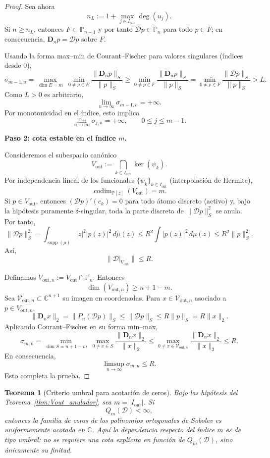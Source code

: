 \documentclass[12pt,a4paper]{article}
\newtheorem{theorem}{Teorema}
\theoremstyle{definition}
\theoremstyle{remark}
\newcommand{\Poly}{\mathbb{P}[z]}
\newcommand{\D}{\mathcal{D}}
\begin{document}
\begin{proof}
  Sea ahora
  \[
    n_L:=1+\max_{j\in I_{\mathrm{out}}}\deg(u_j).
  \]
  Si $n\ge n_L$, entonces $F\subset\mathbb P_{n-1}$ y por tanto
  $\D p\in\mathbb{P}_n$ para todo $p\in F$; en consecuencia,
  $\mathbf D_n p=\D p$ sobre $F$.

  Usando la forma max--min de Courant--Fischer para valores singulares (índices desde $0$),
  \[
    \sigma_{m-1,n}
    =
    \max_{\dim E=m}\ \min_{0\ne p\in E}\frac{\|\mathbf D_np\|_S}{\|p\|_S}
    \ge
    \min_{0\ne p\in F}\frac{\|\mathbf D_np\|_S}{\|p\|_S}
    =
    \min_{0\ne p\in F}\frac{\|\D p\|_S}{\|p\|_S}
    > L.
  \]
  Como $L>0$ es arbitrario,
  \[
    \lim_{n\to\infty}\sigma_{m-1,n}=+\infty.
  \]
  Por monotonicidad en el índice, esto implica
  \[
    \lim_{n\to\infty}\sigma_{j,n}=+\infty,
    \qquad 0\le j\le m-1.
  \]

  \medskip
  \noindent
  \textbf{Paso 2: cota estable en el índice $m$.}

  Consideremos el subespacio canónico
  \[
    V_{\mathrm{out}}:=\bigcap_{k\in I_{\mathrm{out}}}\ker(\psi_k).
  \]
  Por independencia lineal de los funcionales $\{\psi_k\}_{k\in I_{\mathrm{out}}}$
  (interpolación de Hermite),
  \[
    \operatorname{codim}_{\Poly}(V_{\mathrm{out}})=m.
  \]
  Si $p\in V_{\mathrm{out}}$, entonces $(\D p)'(c_k)=0$ para todo átomo discreto
  (activo) y, bajo la hipótesis puramente $\delta$-singular, toda la parte discreta de
  $\|\D p\|_S^2$ se anula. Por tanto,
  \[
    \|\D p\|_S^2
    =
    \int_{\operatorname{supp}(\mu)}|z|^2|p(z)|^2\,d\mu(z)
    \le
    R^2\int |p(z)|^2\,d\mu(z)
    \le
    R^2\|p\|_S^2.
  \]
  Así,
  \[
    \|\D|_{V_{\mathrm{out}}}\|\le R.
  \]

  Definamos $V_{\mathrm{out},n}:=V_{\mathrm{out}}\cap\mathbb{P}_n$. Entonces
  \[
    \dim(V_{\mathrm{out},n})\ge n+1-m.
  \]
  Sea $\mathcal V_{\mathrm{out},n}\subset\mathbb C^{n+1}$ su imagen en coordenadas.
  Para $x\in\mathcal V_{\mathrm{out},n}$ asociado a $p\in V_{\mathrm{out},n}$,
  \[
    \|\mathbf D_nx\|_2
    =
    \|P_n(\D p)\|_S
    \le
    \|\D p\|_S
    \le
    R\|p\|_S
    =
    R\|x\|_2.
  \]
  Aplicando Courant--Fischer en su forma min--max,
  \[
    \sigma_{m,n}
    =
    \min_{\dim S=n+1-m}\ \max_{0\ne x\in S}\frac{\|\mathbf D_nx\|_2}{\|x\|_2}
    \le
    \max_{0\ne x\in\mathcal V_{\mathrm{out},n}}\frac{\|\mathbf D_nx\|_2}{\|x\|_2}
    \le R.
  \]
  En consecuencia,
  \[
    \limsup_{n\to\infty}\sigma_{m,n}\le R.
  \]
  Esto completa la prueba.
\end{proof}

\begin{theorem}[Criterio umbral para acotación de ceros]\label{thm:criterio_singular_ceros_objetivo}
  Bajo las hipótesis del Teorema~\ref{thm:Vout_anulador}, sea $m=|I_{\mathrm{out}}|$. Si
  \[
    Q_m(\D)<\infty,
  \]
  entonces la familia de ceros de los polinomios ortogonales de Sobolev es uniformemente acotada en $\mathbb C$.
  Aquí la dependencia respecto del índice $m$ es de tipo umbral: no se requiere una cota explícita en función de $Q_m(\D)$, sino únicamente su finitud.
\end{theorem}
\end{document}
